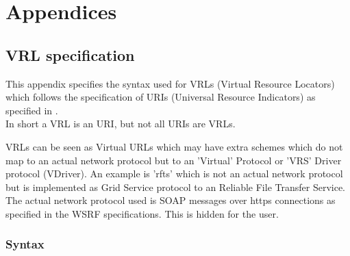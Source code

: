 %
%

\appendix
\chapter{Appendices}
\label{chap:appendices}

\section{VRL specification} 

This appendix specifies the syntax used for VRLs (Virtual Resource Locators)
which follows the specification of URIs (Universal Resource Indicators) as
specified in \cite{bernerslee2005uri}.\\
In short a VRL is an URI, but not all URIs are VRLs.\\
\par
VRLs can be seen as Virtual URLs which may have extra schemes which do not map
to an actual network protocol but to an 'Virtual' Protocol or 'VRS' Driver
protocol (VDriver). An example is 'rfts' which is not an actual network protocol but is
implemented as Grid Service protocol to an Reliable File Transfer Service. The
actual network protocol used is SOAP messages over https connections as
specified in the WSRF specifications. This is hidden for the user. \\

\subsection{Syntax} 

